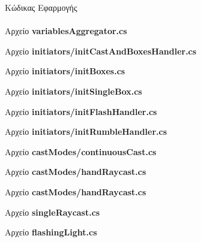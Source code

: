 
{\LARGE Κώδικας Εφαρμογής}
\\
\\

\lstset{style=sharpc}
{\large Αρχείο \textbf{variablesAggregator.cs}}\label{lst:variablesAggregator}


{\large Αρχείο \textbf{initiators/initCastAndBoxesHandler.cs}}\label{lst:initCastAndBoxesHandler}


{\large Αρχείο \textbf{initiators/initBoxes.cs}}\label{lst:initBoxes}


{\large Αρχείο \textbf{initiators/initSingleBox.cs}}\label{lst:initSingleBox}


{\large Αρχείο \textbf{initiators/initFlashHandler.cs}}\label{lst:initFlashHandler}


{\large Αρχείο \textbf{initiators/initRumbleHandler.cs}}\label{lst:initRumbleHandler}


{\large Αρχείο \textbf{castModes/continuousCast.cs}}\label{lst:continuousCast}


{\large Αρχείο \textbf{castModes/handRaycast.cs}}\label{lst:handRaycast}


{\large Αρχείο \textbf{castModes/handRaycast.cs}}\label{lst:handRaycast}


{\large Αρχείο \textbf{singleRaycast.cs}}\label{lst:singleRaycast}


{\large Αρχείο \textbf{flashingLight.cs}}\label{lst:flashingLight}
